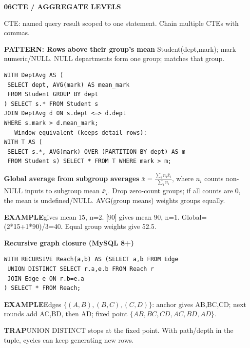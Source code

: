 \documentclass[a4paper]{article}
\newcommand{\sqlfont}{\ttfamily}
\newcommand{\bodyfontsize}{5.55}
\newcommand{\bodyleading}{5.3}
\newcommand{\bodylineskiplimit}{-2pt}
\newcommand{\bodystyle}{%
  \fontsize{\bodyfontsize}{\bodyleading}\selectfont\setlength{\lineskiplimit}{\bodylineskiplimit}\RaggedRight
  \setlength{\abovedisplayskip}{.5pt}\setlength{\belowdisplayskip}{.5pt}%
  \setlength{\abovedisplayshortskip}{.3pt}\setlength{\belowdisplayshortskip}{.3pt}}
\newcommand{\topic}[2]{\par\addvspace{.45pt}\nointerlineskip%
  \begingroup\setlength{\fboxsep}{0.35pt}%
  \noindent\colorbox{structure}{\parbox{\dimexpr\linewidth-2\fboxsep\relax}{%
    \color{white}\fontsize{6.45}{6.8}\selectfont\bfseries #1\enspace #2}}%
  \endgroup\par\nobreak\vspace{.55pt}\nointerlineskip\nobreak}
\newenvironment{topicblock}
  {\par\bodystyle}
  {\par}
\newcommand{\key}[1]{\par\textcolor{structure}{\textbf{#1}}\enspace}
\newcommand{\note}[4]{\par\nointerlineskip\vspace{.25pt}\begingroup\setlength{\fboxsep}{0.1pt}%
  \noindent\colorbox{#1}{\parbox{\dimexpr\linewidth-2\fboxsep\relax}{%
    \RaggedRight\textcolor{#2}{\textbf{#3}}\enspace #4}}%
  \endgroup\par\nointerlineskip\vspace{.25pt}}
\newcommand{\trap}[1]{\note{warningbg}{warning}{TRAP}{#1}}
\newcommand{\ex}[1]{\note{examplebg}{example}{EXAMPLE}{#1}}
\newcommand{\pattern}[1]{\key{PATTERN: #1}}
\newcommand{\sql}[1]{{\sqlfont\color{sqltext}\detokenize{#1}}}
\newlength{\sheetwidth}
\newenvironment{sheetcolumns}[1]
  {\noindent\begin{minipage}[t]{#1\sheetwidth}\vspace{0pt}\bodystyle\ignorespaces}
  {\end{minipage}\par}
\begin{document}
\begin{sheetcolumns}{.254}
\begin{topicblock}
\topic{06}{CTE / AGGREGATE LEVELS}
CTE: named query result scoped to one statement. Chain multiple CTEs with commas.
\pattern{Rows above their group's mean}
Student(dept,mark); mark numeric/NULL. NULL departments form one group; \sql{<=>} matches that group.
\begin{lstlisting}
WITH DeptAvg AS (
 SELECT dept, AVG(mark) AS mean_mark
 FROM Student GROUP BY dept
) SELECT s.* FROM Student s
JOIN DeptAvg d ON s.dept <=> d.dept
WHERE s.mark > d.mean_mark;
-- Window equivalent (keeps detail rows):
WITH T AS (
 SELECT s.*, AVG(mark) OVER (PARTITION BY dept) AS m
 FROM Student s) SELECT * FROM T WHERE mark > m;
\end{lstlisting}
\key{Global average from subgroup averages}
$\bar{x}=\frac{\sum_i n_i\bar{x}_i}{\sum_i n_i}$, where $n_i$ counts non-NULL inputs to subgroup mean $\bar{x}_i$. Drop zero-count groups; if all counts are 0, the mean is undefined/NULL. AVG(group means) weights groups equally.
\ex{[10,20] gives mean 15, n=2. [90] gives mean 90, n=1. Global=(2*15+1*90)/3=40. Equal group weights give 52.5.}
\key{Recursive graph closure (MySQL 8+)}
\begin{lstlisting}
WITH RECURSIVE Reach(a,b) AS (SELECT a,b FROM Edge
 UNION DISTINCT SELECT r.a,e.b FROM Reach r
 JOIN Edge e ON r.b=e.a
) SELECT * FROM Reach;
\end{lstlisting}
\ex{Edges $\{(A,B),(B,C),(C,D)\}$: anchor gives AB,BC,CD; next rounds add AC,BD, then AD; fixed point $\{AB,BC,CD,AC,BD,AD\}$.}
\trap{UNION DISTINCT stops at the fixed point. With path/depth in the tuple, cycles can keep generating new rows.}
\end{topicblock}


\end{sheetcolumns}
\end{document}
